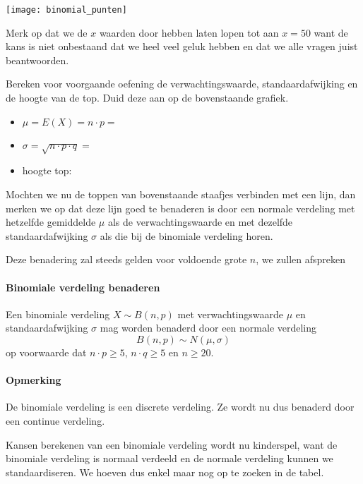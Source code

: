 \documentclass[a4paper,12pt, twoside]{article}
\begin{document}
\begin{center}
\texttt{[image: binomial\_punten]}
\end{center}

Merk op dat we de $x$ waarden door hebben laten lopen tot aan $x=50$ want de kans is niet onbestaand dat we heel veel geluk hebben en dat we alle vragen juist beantwoorden.

\begin{oefening}
Bereken voor voorgaande oefening de verwachtingswaarde, standaardafwijking en de hoogte van de top. Duid deze aan op de bovenstaande grafiek.
\begin{itemize}
  \item $\mu=E(X)=n\cdot p=$ \arulefill
  \item $\sigma=\sqrt{n\cdot p\cdot q}=$ \arulefill
  \item hoogte top: \arulefill
\end{itemize}
\end{oefening}

Mochten we nu de toppen van bovenstaande staafjes verbinden met een lijn, dan merken we op dat deze lijn goed te benaderen is door een normale verdeling met hetzelfde gemiddelde $\mu$ als de verwachtingswaarde en met dezelfde standaardafwijking $\sigma$ als die bij de binomiale verdeling horen.

Deze benadering zal steeds gelden voor voldoende grote $n$, we zullen afspreken

\paragraph*{Binomiale verdeling benaderen}
\begin{mdframed}
Een binomiale verdeling $X\sim B(n,p)$ met verwachtingswaarde $\mu$ en standaardafwijking $\sigma$ mag worden benaderd door een normale verdeling
$$B(n,p)\sim N(\mu,\sigma)$$
op voorwaarde dat $n\cdot p\geq5$, $n\cdot q\geq5$ en $n\geq 20$.
\end{mdframed}

\paragraph*{Opmerking} De binomiale verdeling is een discrete verdeling. Ze wordt nu dus benaderd door een continue verdeling.

Kansen berekenen van een binomiale verdeling wordt nu kinderspel, want de binomiale verdeling is normaal verdeeld en de normale verdeling kunnen we standaardiseren. We hoeven dus enkel maar nog op te zoeken in de tabel.
\end{document}
